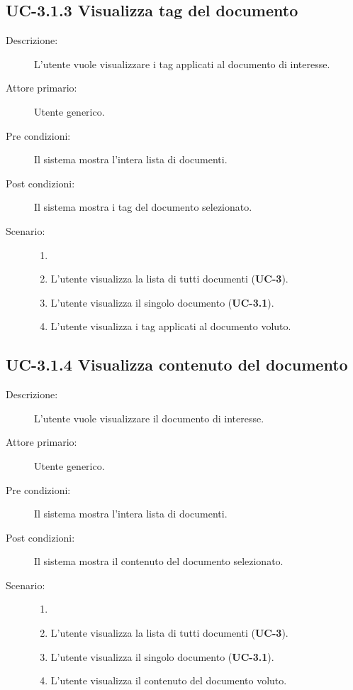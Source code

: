 \subsection{UC-3.1.3 Visualizza tag del documento}
\begin{description}
    \item[Descrizione:] L'utente vuole visualizzare i tag applicati al documento di interesse.
    \item[Attore primario:] Utente generico.
    \item[Pre condizioni:] Il sistema mostra l’intera lista di documenti.
    \item[Post condizioni:] Il sistema mostra i tag del documento selezionato.
    \item[Scenario:]
    \begin{enumerate}
        \item[]
        \item L’utente visualizza la lista di tutti documenti (\textbf{UC-3}).
        \item L'utente visualizza il singolo documento (\textbf{UC-3.1}).
        \item L'utente visualizza i tag applicati al documento voluto.
    \end{enumerate}
\end{description}

\subsection{UC-3.1.4 Visualizza contenuto del documento}
\begin{description}
    \item[Descrizione:] L'utente vuole visualizzare il documento di interesse.
    \item[Attore primario:] Utente generico.
    \item[Pre condizioni:] Il sistema mostra l’intera lista di documenti.
    \item[Post condizioni:] Il sistema mostra il contenuto del documento selezionato.
    \newpage
    \item[Scenario:]
    \begin{enumerate}
        \item[]
        \item L’utente visualizza la lista di tutti documenti (\textbf{UC-3}).
        \item L'utente visualizza il singolo documento (\textbf{UC-3.1}).
        \item L'utente visualizza il contenuto del documento voluto.
    \end{enumerate}
\end{description}

